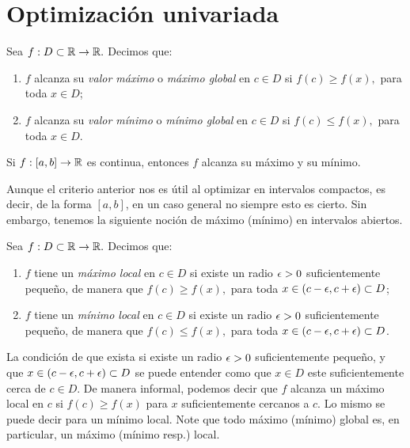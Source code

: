 
\section{Optimización univariada}


    \begin{definicion} Sea $f:D\subset \mathbb{R} \to \mathbb{R}.$ Decimos que:
        \begin{enumerate}
            \item $f$ alcanza su \emph{valor máximo} o \emph{máximo global} en $c\in D$ si $f(c)\geq f(x),$ para toda $x\in D$;
            \item $f$ alcanza su \emph{valor mínimo} o \emph{mínimo global} en $c\in D$ si $f(c)\leq f(x),$ para toda $x\in D$.
        \end{enumerate}

    \end{definicion}


    \begin{teorema}
        Si $f:[a,b]\to \mathbb{R}$ es continua, entonces $f$ alcanza su máximo y su mínimo.
    \end{teorema}


    Aunque el criterio anterior nos es útil al optimizar en intervalos compactos, es decir, de la forma $[a,b]$, en un caso
    general no siempre esto es cierto. Sin embargo, tenemos la siguiente noción de máximo (mínimo) en intervalos abiertos.


    \begin{definicion} Sea $f:D\subset \mathbb{R} \to \mathbb{R}.$ Decimos que:
        \begin{enumerate}
            \item $f$ tiene un \emph{máximo local} en $c\in D$ si existe un radio $\epsilon>0$ suficientemente pequeño, de
            manera que $f(c)\geq f(x),$ para toda $x\in (c-\epsilon,c+\epsilon)\subset D$;
            \item $f$ tiene un \emph{mínimo local} en $c\in D$ si existe un radio $\epsilon>0$ suficientemente pequeño, de
            manera que $f(c)\leq f(x),$ para toda $x\in (c-\epsilon,c+\epsilon)\subset D$.
        \end{enumerate}

    \end{definicion}


    \begin{observacion}
        La condición de que exista si existe un radio $\epsilon>0$ suficientemente pequeño, y que $x\in (c-\epsilon,c+\epsilon)\subset D$ se
        puede entender como que $x\in D$ este suficientemente cerca de $c\in D.$ De manera informal, podemos decir que $f$
        alcanza un máximo local en $c$ si $f(c)\geq f(x)$ para $x$ suficientemente cercanos a $c.$ Lo mismo se puede decir para
        un mínimo local. Note que todo máximo (mínimo) global es, en particular, un máximo (mínimo resp.) local.
    \end{observacion}


